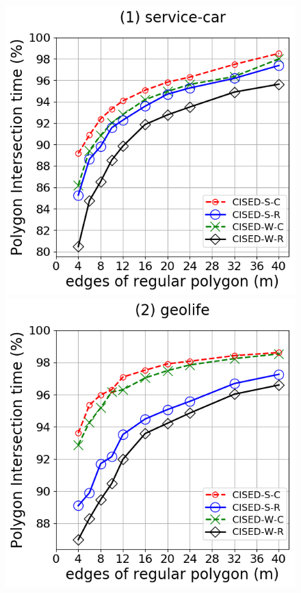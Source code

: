 \begin{figure}[tb!]
	\centering
	\includegraphics[scale = 0.3]{Figures/Exp-M-poly-time-ratio-service.png}
	\includegraphics[scale = 0.3]{Figures/Exp-M-poly-time-ratio-geolife.png}

\end{figure}
